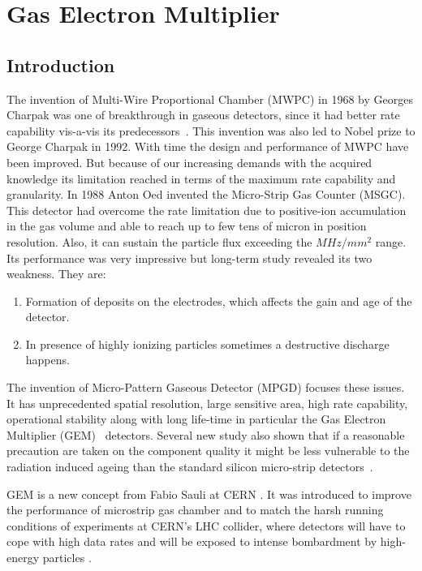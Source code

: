 \chapter{Gas Electron Multiplier} %
\label{cha:gas_electron_multiplier}

\section{Introduction} %
\label{sec:introduction}

The invention of Multi-Wire Proportional Chamber (MWPC) in 1968 by Georges Charpak was one of breakthrough in gaseous detectors, since it had better rate capability vis-a-vis its predecessors~\cite{Charpak1968}. 
This invention was also led to Nobel prize to George Charpak in 1992. With time the design and performance of MWPC have been improved. But because of our increasing demands with the acquired knowledge its limitation reached in terms of the maximum rate capability and granularity. In 1988 Anton Oed invented the Micro-Strip Gas Counter (MSGC). 
This detector had overcome the rate limitation due to positive-ion accumulation in the gas volume and able to reach up to few tens of micron in position resolution. 
Also, it can sustain the particle flux exceeding the $MHz/mm^2$ range. Its performance was very impressive but long-term study revealed its two weakness. They are:
\begin{enumerate}
	\item Formation of deposits on the electrodes, which affects the gain and age of the detector.
	\item In presence of highly ionizing particles sometimes a destructive discharge happens.
\end{enumerate}
The invention of Micro-Pattern Gaseous Detector (MPGD) focuses these issues. 
It has unprecedented spatial resolution, large sensitive area, high rate capability, operational stability along with long life-time in particular the Gas Electron Multiplier (GEM)~\cite{Sauli1997,Sauli1999} detectors. 
Several new study also shown that if a reasonable precaution are taken on the component quality it might be less vulnerable to the radiation induced ageing than the standard silicon micro-strip detectors~\cite{TITOV2004,Titov2002}.

GEM is a new concept from Fabio Sauli at CERN \cite{Sauli1997}. It was introduced to improve the performance of microstrip gas chamber and to match the harsh running conditions of experiments at CERN's LHC collider, where detectors will have to cope with high data rates and will be exposed to intense bombardment by high-energy particles \cite{detector:1732870}.

